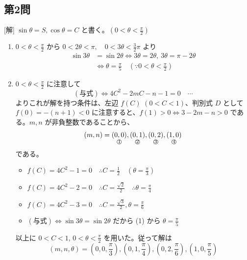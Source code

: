 \documentclass[../main.tex]{subfiles}
\begin{document}
\subsection*{第2問}
[解] $\sin\theta = S, \cos\theta = C$ と書く。$\left(0 < \theta < \frac{\pi}{2}\right)$
\begin{enumerate}
  \item[(1)] $0 < \theta < \frac{\pi}{2}$ から $0 < 2\theta < \pi, \quad 0 < 3\theta < \frac{3}{2}\pi$ より
    \begin{align*}
      \sin 3\theta &= \sin 2\theta \Leftrightarrow 3\theta = 2\theta,\ 3\theta = \pi - 2\theta \\
      &\Leftrightarrow \theta = \frac{\pi}{5} \quad \left( \because 0 < \theta < \frac{\pi}{2} \right)
    \end{align*}

  \item[(2)] $0 < \theta < \frac{\pi}{2}$ に注意して
    \begin{equation*}
      (\text{与式}) \Leftrightarrow 4C^2 - 2mC - n - 1 = 0 \quad \cdots
    \end{equation*}
    よりこれが解を持つ条件は、左辺 $f(C)$ $(0 < C < 1)$、判別式 $D$ として
    $f(0) = -(n+1) < 0$ に注意すると、$f(1) > 0 \Leftrightarrow 3-2m-n > 0$
    である。$m, n$ が非負整数であることから、
    \begin{equation*}
      (m, n) = \underset{\text{\textcircled{1}}}{(0, 0)}, \underset{\text{\textcircled{2}}}{(0, 1)}, \underset{\text{\textcircled{3}}}{(0, 2)}, \underset{\text{\textcircled{4}}}{(1, 0)}
    \end{equation*}
    である。
    \begin{itemize}
      \item[$1^\circ$の時]
        $f(C) = 4C^2 - 1 = 0 \quad \therefore C = \frac{1}{2} \quad \left(\theta = \frac{\pi}{3}\right)$
      \item[$2^\circ$の時]
        $f(C) = 4C^2 - 2 = 0 \quad \therefore C = \frac{\sqrt{2}}{2} \quad \therefore \theta = \frac{\pi}{4}$
      \item[$3^\circ$の時]
        $f(C) = 4C^2 - 3 = 0 \quad \therefore C = \frac{\sqrt{3}}{2}, \theta = \frac{\pi}{6}$
      \item[$4^\circ$の時]
        $(\text{与式}) \Leftrightarrow \sin 3\theta = \sin 2\theta$ だから (1) から $\theta = \frac{\pi}{5}$
    \end{itemize}
    以上に $0 < C < 1$, $0 < \theta < \frac{\pi}{2}$ を用いた。従って解は
    \begin{equation*}
      (m, n, \theta) = \left(0, 0, \frac{\pi}{3}\right), \left(0, 1, \frac{\pi}{4}\right), \left(0, 2, \frac{\pi}{6}\right), \left(1, 0, \frac{\pi}{5}\right)
    \end{equation*}
\end{enumerate}
\end{document}
